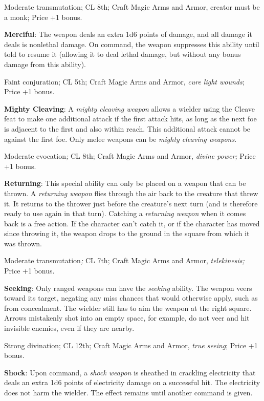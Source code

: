 Moderate transmutation; CL 8th; Craft Magic Arms and Armor, creator must be a monk; Price +1 bonus.
				
\textbf{Merciful}: The weapon deals an extra 1d6 points of damage, and all damage it deals is nonlethal damage. On command, the weapon suppresses this ability until told to resume it (allowing it to deal lethal damage, but without any bonus damage from this ability).
				
Faint conjuration; CL 5th; Craft Magic Arms and Armor, \textit{cure light wounds}; Price +1 bonus.
				
\textbf{Mighty Cleaving}: A \textit{mighty cleaving weapon} allows a wielder using the Cleave feat to make one additional attack if the first attack hits, as long as the next foe is adjacent to the first and also within reach. This additional attack cannot be against the first foe. Only melee weapons can be \textit{mighty cleaving weapons}.
				
Moderate evocation\textit{; }CL 8th; Craft Magic Arms and Armor, \textit{divine power; }Price +1 bonus.
				
\textbf{Returning}: This special ability can only be placed on a weapon that can be thrown. A \textit{returning weapon} flies through the air back to the creature that threw it. It returns to the thrower just before the creature's next turn (and is therefore ready to use again in that turn). Catching a \textit{returning weapon} when it comes back is a free action. If the character can't catch it, or if the character has moved since throwing it, the weapon drops to the ground in the square from which it was thrown.
				
Moderate transmutation\textit{; }CL 7th; Craft Magic Arms and Armor, \textit{telekinesis; }Price +1 bonus.
				
\textbf{Seeking}: Only ranged weapons can have the \textit{seeking }ability. The weapon veers toward its target, negating any miss chances that would otherwise apply, such as from concealment. The wielder still has to aim the weapon at the right square. Arrows mistakenly shot into an empty space, for example, do not veer and hit invisible enemies, even if they are nearby.
				
Strong divination; CL 12th; Craft Magic Arms and Armor, \textit{true seeing}; Price +1 bonus.
				
\textbf{Shock}: Upon command, a \textit{shock weapon} is sheathed in crackling electricity that deals an extra 1d6 points of electricity damage on a successful hit. The electricity does not harm the wielder. The effect remains until another command is given. 
				
